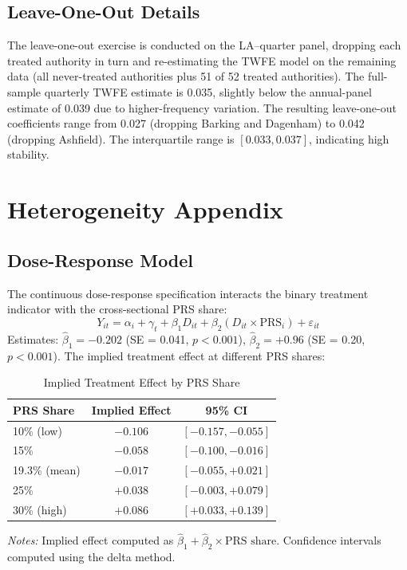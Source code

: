 \documentclass[12pt]{article}
\begin{document}
\subsection{Leave-One-Out Details}

The leave-one-out exercise is conducted on the LA--quarter panel, dropping each treated authority in turn and re-estimating the TWFE model on the remaining data (all never-treated authorities plus 51 of 52 treated authorities). The full-sample quarterly TWFE estimate is 0.035, slightly below the annual-panel estimate of 0.039 due to higher-frequency variation. The resulting leave-one-out coefficients range from 0.027 (dropping Barking and Dagenham) to 0.042 (dropping Ashfield). The interquartile range is $[0.033, 0.037]$, indicating high stability.


\section{Heterogeneity Appendix}
\label{sec:app_het}

\subsection{Dose-Response Model}

The continuous dose-response specification interacts the binary treatment indicator with the cross-sectional PRS share:
\begin{equation}
Y_{it} = \alpha_i + \gamma_t + \beta_1 D_{it} + \beta_2 (D_{it} \times \text{PRS}_i) + \varepsilon_{it}
\end{equation}
Estimates: $\hat{\beta}_1 = -0.202$ (SE = 0.041, $p < 0.001$), $\hat{\beta}_2 = +0.96$ (SE = 0.20, $p < 0.001$). The implied treatment effect at different PRS shares:

\begin{table}[H]
\centering
\caption{Implied Treatment Effect by PRS Share}
\begin{tabular}{lcc}
\toprule
PRS Share & Implied Effect & 95\% CI \\
\midrule
10\% (low) & $-0.106$ & $[-0.157, -0.055]$ \\
15\% & $-0.058$ & $[-0.100, -0.016]$ \\
19.3\% (mean) & $-0.017$ & $[-0.055, +0.021]$ \\
25\% & $+0.038$ & $[-0.003, +0.079]$ \\
30\% (high) & $+0.086$ & $[+0.033, +0.139]$ \\
\bottomrule
\end{tabular}
\begin{tablenotes}[flushleft]
\small
\item \textit{Notes:} Implied effect computed as $\hat{\beta}_1 + \hat{\beta}_2 \times \text{PRS share}$. Confidence intervals computed using the delta method.
\end{tablenotes}
\end{table}
\end{document}
